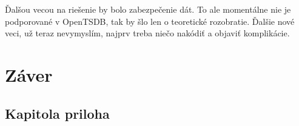 \documentclass[11pt,final,oneside]{fithesis}
\begin{document}
Ďalšou vecou na riešenie by bolo zabezpečenie dát. To ale momentálne nie je podporované v OpenTSDB, tak by šlo len o teoretické rozobratie. Ďalšie nové veci, už teraz nevymyslím, najprv treba niečo nakódiť
a objaviť komplikácie.

\chapter{Záver}


\nocite{*}


\begin{appendix}
\chapter{Kapitola priloha}
\end{appendix}
\end{document}
